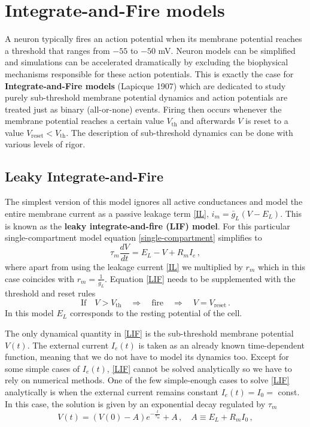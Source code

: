 \documentclass[titlepage]{article}
\begin{document}
\section{Integrate-and-Fire models}

A neuron typically fires an action potential when its membrane potential reaches a threshold that ranges from $-55$ to $-50$ mV. Neuron models can be simplified and simulations can be accelerated dramatically by excluding the biophysical mechanisms responsible for these action potentials. This is exactly the case for \textbf{Integrate-and-Fire models} (Lapicque 1907) which are dedicated to study purely sub-threshold membrane potential dynamics and action potentials are treated just as binary (all-or-none) events. Firing then occurs whenever the membrane potential reaches a certain value $V_{\text{th}}$ and afterwards $V$ is reset to a value $V_{\text{reset}} < V_{\text{th}}$. The description of sub-threshold dynamics can be done with various levels of rigor. 

\subsection{Leaky Integrate-and-Fire}

The simplest version of this model ignores all active conductances and model the entire membrane current as a passive leakage term \eqref{IL}, $i_m = \bar{g}_L (V - E_L)$. This is known as the \textbf{leaky integrate-and-fire (LIF) model}. For this particular single-compartment model equation \eqref{single-compartment} simplifies to
\begin{equation}\label{LIF}
\tau_m \frac{d V}{d t} = E_L - V + R_m I_e\,,
\end{equation}
where apart from using the leakage current \eqref{IL} we multiplied by $r_m$ which in this case coincides with $r_m = \frac{1}{\bar{g}_L}$. Equation \eqref{LIF} needs to be supplemented with the threshold and reset rules 
\begin{equation}\label{th_and_reset}
\text{If} \quad V > V_{\text{th}} \quad \Rightarrow \quad \text{fire} \quad \Rightarrow \quad V = V_{\text{reset}}\,.
\end{equation}
In this model $E_L$ corresponds to the resting potential of the cell.

The only dynamical quantity in \eqref{LIF} is the sub-threshold membrane potential $V(t)$. The external current $I_e(t)$ is taken as an already known time-dependent function, meaning that we do not have to model its dynamics too. Except for some simple cases of $I_e(t)$, \eqref{LIF} cannot be solved analytically so we have to rely on numerical methods. One of the few simple-enough cases to solve \eqref{LIF} analytically is when the external current remains constant $I_e(t) = I_0 = $ const. In this case, the solution is given by an exponential decay regulated by $\tau_m$
\begin{equation}\label{Iconst}
V(t) = (V(0) - A) e^{-\frac{t}{\tau_m}} + A \,, \quad A \equiv E_L + R_m I_0\,,
\end{equation}
\end{document}
